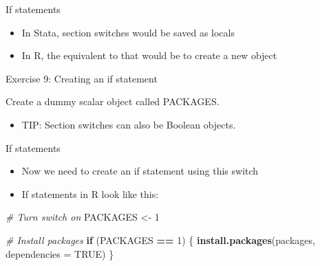 \documentclass[ignorenonframetext,]{beamer}
\newenvironment{Shaded}{\begin{snugshade}}{\end{snugshade}}
\newcommand{\KeywordTok}[1]{\textcolor[rgb]{0.13,0.29,0.53}{\textbf{#1}}}
\newcommand{\DataTypeTok}[1]{\textcolor[rgb]{0.13,0.29,0.53}{#1}}
\newcommand{\DecValTok}[1]{\textcolor[rgb]{0.00,0.00,0.81}{#1}}
\newcommand{\StringTok}[1]{\textcolor[rgb]{0.31,0.60,0.02}{#1}}
\newcommand{\CommentTok}[1]{\textcolor[rgb]{0.56,0.35,0.01}{\textit{#1}}}
\newcommand{\OtherTok}[1]{\textcolor[rgb]{0.56,0.35,0.01}{#1}}
\newcommand{\ControlFlowTok}[1]{\textcolor[rgb]{0.13,0.29,0.53}{\textbf{#1}}}
\newcommand{\OperatorTok}[1]{\textcolor[rgb]{0.81,0.36,0.00}{\textbf{#1}}}
\newcommand{\NormalTok}[1]{#1}
\providecommand{\tightlist}{%
  \setlength{\itemsep}{0pt}\setlength{\parskip}{0pt}}
\begin{document}
\begin{frame}{If statements}

\begin{itemize}
\tightlist
\item
  In Stata, section switches would be saved as locals
\item
  In R, the equivalent to that would be to create a new object
\end{itemize}

\begin{block}{Exercise 9: Creating an if statement}

Create a dummy scalar object called PACKAGES.

\begin{itemize}
\tightlist
\item
  TIP: Section switches can also be Boolean objects.
\end{itemize}

\end{block}

\end{frame}

\begin{frame}[fragile]{If statements}

\begin{itemize}
\tightlist
\item
  Now we need to create an if statement using this switch
\item
  If statements in R look like this:
\end{itemize}

\begin{Shaded}
\begin{Highlighting}[]
    \CommentTok{# Turn switch on}
\NormalTok{    PACKAGES <-}\StringTok{ }\DecValTok{1}

    \CommentTok{# Install packages}
    \ControlFlowTok{if}\NormalTok{ (PACKAGES }\OperatorTok{==}\StringTok{ }\DecValTok{1}\NormalTok{) \{}
      \KeywordTok{install.packages}\NormalTok{(packages,}
                       \DataTypeTok{dependencies =} \OtherTok{TRUE}\NormalTok{)}
\NormalTok{    \}}
\end{Highlighting}
\end{Shaded}

\end{frame}
\end{document}
